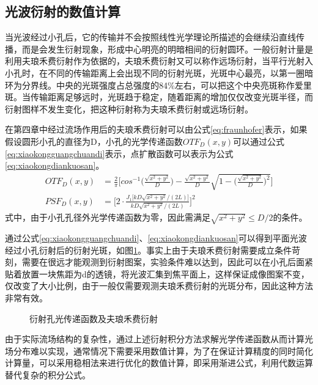 \subsection{光波衍射的数值计算}
当光波经过小孔后，它的传输并不会按照线性光学理论所描述的会继续沿直线传播，而是会发生衍射现象，形成中心明亮的明暗相间的衍射圆环。一般衍射计量是利用夫琅禾费衍射作为依据的，夫琅禾费衍射又可以称作远场衍射，当平行光射入小孔时，在不同的传输距离上会出现不同的衍射光斑，光斑中心最亮，以第一圈暗环为分界线。中央的光斑强度占总强度的84\%左右，可以把这个中央亮斑称作爱里斑。当传输距离足够远时，光斑趋于稳定，随着距离的增加仅仅改变光斑半径，而衍射图样不发生变化，把这种衍射称为夫琅禾费衍射或远场衍射。

在第四章中经过流场作用后的夫琅禾费衍射可以由公式\eqref{eq:fraunhofer}表示，如果假设圆形小孔的直径为D，小孔的光学传递函数$OTF_D(x,y)$可以通过公式\eqref{eq:xiaokongguangchuandi}表示，点扩散函数可以表示为公式\eqref{eq:xiaokongdiankuosan}。
\begin{align}
OTF_D(x,y)&=\frac{2}{\pi}\Bigg[cos^{-1}\Big(\frac{\sqrt{x^2+y^2}}{D}\Big)-\frac{\sqrt{x^2+y^2}}{D}\sqrt{1-\Big(\frac{\sqrt{x^2+y^2}}{D}\Big)^2}\Bigg]
\label{eq:xiaokongguangchuandi}\\
PSF_D(x,y)&=\Bigg[2\cdot\frac{J_1\big[kD\sqrt{x^2+y^2}/(2L)\big]}{kD\sqrt{x^2+y^2}/(2L)}\Bigg]^2
\label{eq:xiaokongdiankuosan}
\end{align}
式中，由于小孔孔径外光学传递函数为零，因此需满足$\sqrt{x^2+y^2}\leq D/2$的条件。

通过公式\eqref{eq:xiaokongguangchuandi}、\eqref{eq:xiaokongdiankuosan}可以得到平面光波经过小孔衍射后的衍射光斑，如图\ref{fig:xiaokong}。事实上由于夫琅禾费衍射需要成立条件苛刻，需要在很远才能观测到衍射图案，实验条件难以达到，因此可以在小孔后面紧贴着放置一块焦距为d的透镜，将光波汇集到焦平面上，这样保证成像图案不变，仅改变了大小比例，由于一般仅需要观测夫琅禾费衍射的光斑分布，因此这种方法非常有效。
\begin{figure}[bhtp]
\centering
{}
\caption{衍射孔光传递函数及夫琅禾费衍射}
\label{fig:xiaokong}
\end{figure}

由于实际流场结构的复杂性，通过上述衍射积分方法求解光学传递函数从而计算光场分布难以实现，通常情况下需要采用数值计算，为了在保证计算精度的同时简化计算量，可以采用稳相法来进行优化的数值计算，即采用渐进公式，利用代数运算替代复杂的积分公式。

